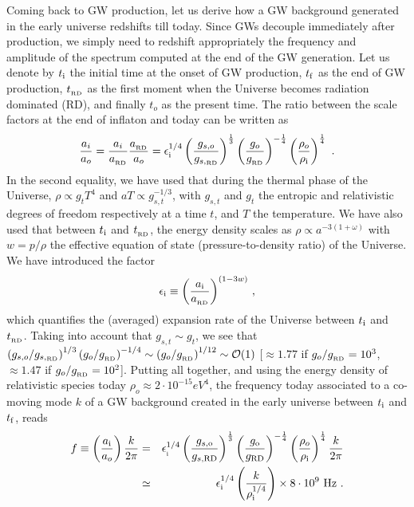 \documentclass[a4paper,11pt]{article}
\newcommand{\be}{\begin{equation}}
\newcommand{\ee}{\end{equation}}
\begin{document}
Coming back to GW production, let us derive how a GW background generated in the early universe redshifts till today. Since GWs decouple immediately after production, we simply need to redshift appropriately the frequency and amplitude of the spectrum computed at the end of the GW generation. Let us denote by $t_{\rm i}$ the initial time at the onset of GW production, $t_{\rm f}$ as the end of GW production, $t_{_{\rm RD}}$ as the first moment when the Universe becomes radiation dominated (RD), and finally $t_o$ as the present time. The ratio between the scale factors at the end of inflaton and today can be written as
\be {a_i\over a_o} = {a_i \over a_{_{\rm RD}} } {a_{_{\rm RD}} \over a_o} =  \epsilon_{\rm i}^{1/4}\left(g_{s,o}\over g_{s,_{\rm RD}}\right)^{1\over3}\left(g_{o}\over g_{_{\rm RD}}\right)^{-{1\over4}}\left({\rho_o\over\rho_{\rm i}}\right)^{1\over4}\ . \ee
In the second equality, we have used that during the thermal phase of the Universe, $\rho \propto g_t T^4$ and $a T \propto g_{s,t}^{-1/3}$, with $g_{s,t}$ and $g_t$  the entropic and relativistic degrees of freedom respectively at a time $t$, and $T$ the temperature. We have also used that between $t_{\rm i}$ and $t_{_{\rm RD}}$, the energy density scales as $\rho \propto a^{-3 (1 + \omega )} $ with $w = p/\rho$ the effective equation of state (pressure-to-density ratio) of the Universe. We have introduced the factor
\be\label{eq:epsilonParameter}
\epsilon_{\rm i} \equiv \left({a_{\rm i}\over a_{_{\rm RD}}}\right)^{(1-3w)}\,,
\ee
which quantifies the (averaged) expansion rate of the Universe between $t_{\rm i}$ and $t_{_{\rm RD}}$. Taking into account that $g_{s,t} \sim g_{t}$, we 
see that $\left(g_{s,o}/g_{s,_{\rm RD}}\right)^{1/3}\left(g_{o}/g_{_{\rm RD}}\right)^{-{1/4}} \sim \left(g_{o}/g_{_{\rm RD}}\right)^{1/12} \sim \mathcal{O}(1)$ [$\approx 1.77$ if $g_{o}/g_{_{\rm RD}} = 10^3$, $\approx 1.47$ if $g_{o}/g_{_{\rm RD}} = 10^2$]. Putting all together, and using the energy density of relativistic species today $\rho_o \approx 2\cdot 10^{-15} eV^4$, the frequency today associated to a co-moving mode $k$ of a GW background created in the early universe between $t_{\rm i}$ and $t_{\rm f}$, reads
\begin{eqnarray} f \equiv \left(a_{\rm i}\over a_o\right){k\over2\pi} &=& \epsilon_{_{\rm i}}^{1/4}\left(\frac{g_{s,\rm{o}}}{g_{s,\rm{RD}}}\right)^{1\over 3}\left(\frac{g_{\rm{o}}}{g_{\rm{RD}}}\right)^{-{1\over 4}}\left(\frac{\rho_o}{\rho_{\rm i}}\right)^{1\over 4}\frac{k}{2\pi} \nonumber\\
&\simeq& \epsilon_{\rm i}^{1/4}\left(\frac{k}{\rho_{\rm i}^{1/4}}\right) \times 8\cdot10^{9}~\mathrm{Hz} \ .\label{eq:ftoday}
\end{eqnarray}
\end{document}
